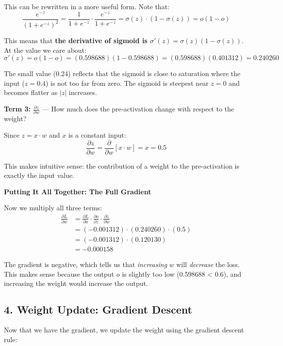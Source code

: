 \documentclass[12pt]{article}
\begin{document}
This can be rewritten in a more useful form. Note that:
\[
\frac{e^{-z}}{(1 + e^{-z})^2} = \frac{1}{1 + e^{-z}} \cdot \frac{e^{-z}}{1 + e^{-z}} = \sigma(z) \cdot (1 - \sigma(z)) = o(1 - o)
\]

This means that \textbf{the derivative of sigmoid is $\sigma'(z) = \sigma(z)(1 - \sigma(z))$}. At the value we care about:
\[
\sigma'(z) = o(1 - o) = (0.598688)(1 - 0.598688) = (0.598688)(0.401312) = 0.240260
\]

The small value (0.24) reflects that the sigmoid is close to saturation where the input ($z = 0.4$) is not too far from zero. The sigmoid is steepest near $z = 0$ and becomes flatter as $|z|$ increases.

\vspace{0.1cm}

\noindent\textbf{Term 3: } $\frac{\partial z}{\partial w}$ — How much does the pre-activation change with respect to the weight?

Since $z = x \cdot w$ and $x$ is a constant input:
\[
\frac{\partial z}{\partial w} = \frac{\partial}{\partial w}[x \cdot w] = x = 0.5
\]

This makes intuitive sense: the contribution of a weight to the pre-activation is exactly the input value.

\vspace{0.2cm}

\noindent\textbf{Putting It All Together: The Full Gradient}

Now we multiply all three terms:
\begin{align*}
\frac{\partial L}{\partial w} &= \frac{\partial L}{\partial o} \cdot \frac{\partial o}{\partial z} \cdot \frac{\partial z}{\partial w} \\
&= (-0.001312) \cdot (0.240260) \cdot (0.5) \\
&= (-0.001312) \cdot (0.120130) \\
&= -0.000158
\end{align*}

The gradient is negative, which tells us that \textit{increasing} $w$ will \textit{decrease} the loss. This makes sense because the output $o$ is slightly too low (0.598688 < 0.6), and increasing the weight would increase the output.

\subsection*{4. Weight Update: Gradient Descent}

Now that we have the gradient, we update the weight using the gradient descent rule:
\end{document}
